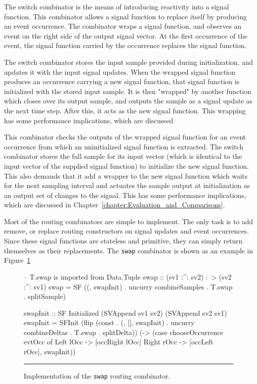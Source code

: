 The switch combinator is the means of introducing reactivity into a signal
function. This combinator allows a signal function to replace itself by
producing an event occurrence. The combinator wraps a signal function, and 
observes an event on the right side of the output signal vector. At the first
occurrence of the event, the signal function carried by the occurrence replaces
the signal function. 

The switch combinator stores the input sample provided during initialization,
and updates it with the input signal updates. When the wrapped signal function
produces an occurrence carrying a new signal function, that signal function is
initialized with the stored input sample. It is then "wrapped" by another
function which closes over its output sample, and outputs the sample as a signal
update as the next time step. After this, it acts as the new signal function.
This wrapping has some performance implications, which are discussed 

This combinator checks the outputs of the wrapped
signal function for an event occurrence from which an uninitialized signal
function is extracted. The switch combinator stores the full sample
for its input vector (which is identical to the input vector of the supplied
signal function) to initialize the new signal function. This also demands that
it add a wrapper to the new signal function which waits for the next sampling
interval and actuates the sample output at initialization as an output set
of changes to the signal. This has some performance implications, which are
discussed in Chapter~\ref{chapter:Evaluation_and_Comparisons}.

Most of the routing combinators are simple to implement. The only task is to add
remove, or replace routing constructors on signal updates and event occurrences.
Since these signal functions are stateless and primitive, they can simply
return themselves as their replacements. The {\tt swap} combinator is shown as
an example in Figure~\ref{figure:swap_implementation}

\begin{figure}
\begin{code}
-- T.swap is imported from Data.Tuple
swap :: (sv1 :^: sv2) :~> (sv2 :^: sv1)
swap =
  SF ((, swapInit) . 
      uncurry combineSamples .
      T.swap . splitSample)

swapInit :: SF Initialized (SVAppend sv1 sv2) (SVAppend sv2 sv1)
swapInit =
  SFInit (flip (const .
                (, [], swapInit) .
                uncurry combineDeltas .
                T.swap . splitDelta))
          (\evtOcc ->
             (case chooseOccurrence evtOcc of
                Left lOcc  -> [occRight lOcc]
                Right rOcc -> [occLeft rOcc], swapInit))

\end{code}
\hrule
\caption{Implementation of the {\tt swap} routing combinator.}
\label{figure:swap_implementation}
\end{figure}

